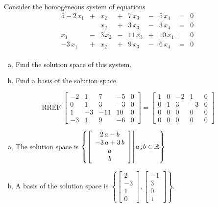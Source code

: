 
\begin{exerciseStatement}


Consider the homogeneous system of equations 
\begin{alignat*}{5} -2 \, x_{1} &+& x_{2} &+& 7 \, x_{3} &-& 5 \, x_{4} &=& 0 \\ & & x_{2} &+& 3 \, x_{3} &-& 3 \, x_{4} &=& 0 \\x_{1} &-& 3 \, x_{2} &-& 11 \, x_{3} &+& 10 \, x_{4} &=& 0 \\-3 \, x_{1} &+& x_{2} &+& 9 \, x_{3} &-& 6 \, x_{4} &=& 0 \\ \end{alignat*}
            


\begin{enumerate}[(a)]
\item  Find the solution space of this system.
\item  Find a basis of the solution space.
\end{enumerate}
    
\end{exerciseStatement}
    
\begin{exerciseAnswer} 


\[\operatorname{RREF} \left[\begin{array}{cccc|c}
-2 & 1 & 7 & -5 & 0 \\
0 & 1 & 3 & -3 & 0 \\
1 & -3 & -11 & 10 & 0 \\
-3 & 1 & 9 & -6 & 0
\end{array}\right] = \left[\begin{array}{cccc|c}
1 & 0 & -2 & 1 & 0 \\
0 & 1 & 3 & -3 & 0 \\
0 & 0 & 0 & 0 & 0 \\
0 & 0 & 0 & 0 & 0
\end{array}\right] \]


\begin{enumerate}[(a)]
\item The solution space is \( \left\{ \left[\begin{array}{c}
2 \, a - b \\
-3 \, a + 3 \, b \\
a \\
b
\end{array}\right] \middle|\,a\text{\texttt{,}}b\in\mathbb{R}\right\} \)
\item A basis of the solution space is \( \left\{ \left[\begin{array}{c}
2 \\
-3 \\
1 \\
0
\end{array}\right] , \left[\begin{array}{c}
-1 \\
3 \\
0 \\
1
\end{array}\right] \right\} \).
\end{enumerate}
    
\end{exerciseAnswer}
    
